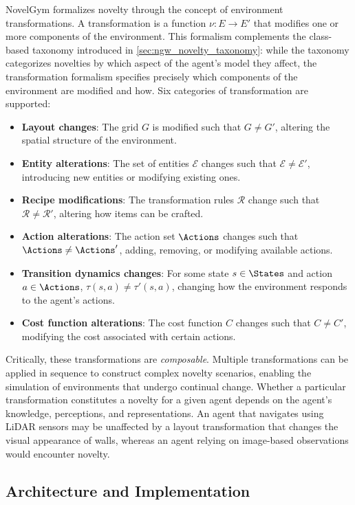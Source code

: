 NovelGym formalizes novelty through the concept of environment transformations. A transformation is a function $\nu : E \rightarrow E'$ that modifies one or more components of the environment. This formalism complements the class-based taxonomy introduced in \cref{sec:ngw_novelty_taxonomy}: while the taxonomy categorizes novelties by which aspect of the agent's model they affect, the transformation formalism specifies precisely which components of the environment are modified and how. Six categories of transformation are supported:
\begin{itemize}[leftmargin=*]
    \item \textbf{Layout changes}: The grid $G$ is modified such that $G \neq G'$, altering the spatial structure of the environment.
    \item \textbf{Entity alterations}: The set of entities $\mathcal{E}$ changes such that $\mathcal{E} \neq \mathcal{E}'$, introducing new entities or modifying existing ones.
    \item \textbf{Recipe modifications}: The transformation rules $\mathcal{R}$ change such that $\mathcal{R} \neq \mathcal{R}'$, altering how items can be crafted.
    \item \textbf{Action alterations}: The action set $\Actions$ changes such that $\Actions \neq \Actions'$, adding, removing, or modifying available actions.
    \item \textbf{Transition dynamics changes}: For some state $s \in \States$ and action $a \in \Actions$, $\tau(s, a) \neq \tau'(s, a)$, changing how the environment responds to the agent's actions.
    \item \textbf{Cost function alterations}: The cost function $C$ changes such that $C \neq C'$, modifying the cost associated with certain actions.
\end{itemize}

Critically, these transformations are \emph{composable}. Multiple transformations can be applied in sequence to construct complex novelty scenarios, enabling the simulation of environments that undergo continual change. Whether a particular transformation constitutes a novelty for a given agent depends on the agent's knowledge, perceptions, and representations. An agent that navigates using LiDAR sensors may be unaffected by a layout transformation that changes the visual appearance of walls, whereas an agent relying on image-based observations would encounter novelty.


\subsection{Architecture and Implementation}
\label{sec:ng_architecture}


